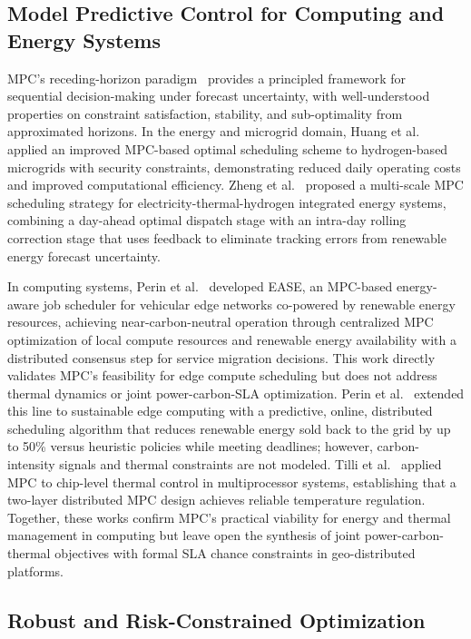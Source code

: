 \documentclass[a4paper,fleqn]{cas-dc}
\begin{document}
\subsection{Model Predictive Control for Computing and Energy Systems}

MPC's receding-horizon paradigm~\cite{ref-mayne00} provides a principled framework for sequential decision-making under forecast uncertainty, with well-understood properties on constraint satisfaction, stability, and sub-optimality from approximated horizons. In the energy and microgrid domain, Huang et al.~\cite{ref-huang23} applied an improved MPC-based optimal scheduling scheme to hydrogen-based microgrids with security constraints, demonstrating reduced daily operating costs and improved computational efficiency. Zheng et al.~\cite{ref-zheng23} proposed a multi-scale MPC scheduling strategy for electricity-thermal-hydrogen integrated energy systems, combining a day-ahead optimal dispatch stage with an intra-day rolling correction stage that uses feedback to eliminate tracking errors from renewable energy forecast uncertainty.

In computing systems, Perin et al.~\cite{ref-perin21ease} developed EASE, an MPC-based energy-aware job scheduler for vehicular edge networks co-powered by renewable energy resources, achieving near-carbon-neutral operation through centralized MPC optimization of local compute resources and renewable energy availability with a distributed consensus step for service migration decisions. This work directly validates MPC's feasibility for edge compute scheduling but does not address thermal dynamics or joint power-carbon-SLA optimization. Perin et al.~\cite{ref-perin22} extended this line to sustainable edge computing with a predictive, online, distributed scheduling algorithm that reduces renewable energy sold back to the grid by up to 50\% versus heuristic policies while meeting deadlines; however, carbon-intensity signals and thermal constraints are not modeled. Tilli et al.~\cite{ref-tilli22} applied MPC to chip-level thermal control in multiprocessor systems, establishing that a two-layer distributed MPC design achieves reliable temperature regulation. Together, these works confirm MPC's practical viability for energy and thermal management in computing but leave open the synthesis of joint power-carbon-thermal objectives with formal SLA chance constraints in geo-distributed platforms.

\subsection{Robust and Risk-Constrained Optimization}
\end{document}
